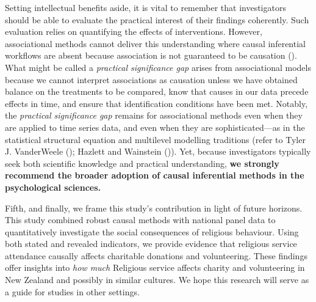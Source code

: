 \documentclass[
  single column]{article}
\begin{document}
Setting intellectual benefits aside, it is vital to remember that
investigators should be able to evaluate the practical interest of their
findings coherently. Such evaluation relies on quantifying the effects
of interventions. However, associational methods cannot deliver this
understanding where causal inferential workflows are absent because
association is not guaranteed to be causation
(). What might
be called a \emph{practical significance gap} arises from associational
models because we cannot interpret associations as causation unless we
have obtained balance on the treatments to be compared, know that causes
in our data precede effects in time, and ensure that identification
conditions have been met. Notably, the \emph{practical significance gap}
remains for associational methods even when they are applied to time
series data, and even when they are sophisticated---as in the
statistical structural equation and multilevel modelling traditions
(refer to Tyler J. VanderWeele
(); Hazlett and Wainstein
()). Yet, because
investigators typically seek both scientific knowledge and practical
understanding, \textbf{we strongly recommend the broader adoption of
causal inferential methods in the psychological sciences.}

Fifth, and finally, we frame this study's contribution in light of
future horizons. This study combined robust causal methods with national
panel data to quantitatively investigate the social consequences of
religious behaviour. Using both stated and revealed indicators, we
provide evidence that religious service attendance causally affects
charitable donations and volunteering. These findings offer insights
into \emph{how much} Religious service affects charity and volunteering
in New Zealand and possibly in similar cultures. We hope this research
will serve as a guide for studies in other settings.
\end{document}
